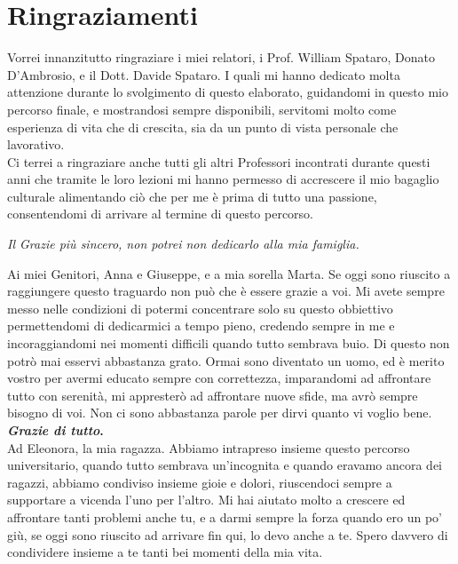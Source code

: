\documentclass[tesi]{subfiles}
\begin{document}
\section*{Ringraziamenti}\label{sc:Ringraziamenti}
Vorrei innanzitutto ringraziare i miei relatori, i Prof. William Spataro, Donato D’Ambrosio, e il Dott. Davide Spataro. I quali mi hanno dedicato molta attenzione durante lo svolgimento di questo elaborato, guidandomi in questo mio percorso finale, e mostrandosi sempre disponibili, servitomi molto come esperienza di vita che di crescita, sia da un punto di vista personale che lavorativo.\\


Ci terrei a ringraziare anche tutti gli altri Professori incontrati durante questi anni che tramite le loro lezioni mi hanno permesso di accrescere il mio bagaglio culturale alimentando ciò che per me è prima di tutto una passione, consentendomi di arrivare al termine di questo percorso.\\

\begin{center}
\textit{Il Grazie più sincero, non potrei non dedicarlo alla mia famiglia.}\\
\end{center}

Ai miei Genitori, Anna e Giuseppe, e a mia sorella Marta. Se oggi sono riuscito a raggiungere questo traguardo non può che è essere grazie a voi. Mi avete sempre messo nelle condizioni di potermi concentrare solo su questo obbiettivo permettendomi di dedicarmici a tempo pieno, credendo sempre in me e incoraggiandomi nei momenti difficili quando tutto sembrava buio. Di questo non potrò mai esservi abbastanza grato. Ormai sono diventato un uomo, ed è merito vostro per avermi educato sempre con correttezza, imparandomi ad affrontare tutto con serenità, mi appresterò ad affrontare nuove sfide, ma avrò sempre bisogno di voi.
Non ci sono abbastanza parole per dirvi quanto vi voglio bene. \textbf{\textit{Grazie di tutto}.}\\


Ad Eleonora, la mia ragazza. Abbiamo intrapreso insieme questo percorso universitario, quando tutto sembrava un’incognita e quando eravamo ancora dei ragazzi, abbiamo condiviso insieme gioie e dolori, riuscendoci sempre a supportare a vicenda l’uno per l’altro. Mi hai aiutato molto a crescere ed affrontare tanti problemi anche tu, e a darmi sempre la forza quando ero un po’ giù, se oggi sono riuscito ad arrivare fin qui, lo devo anche a te. Spero davvero di condividere insieme a te tanti bei momenti della mia vita.\\
\end{document}
